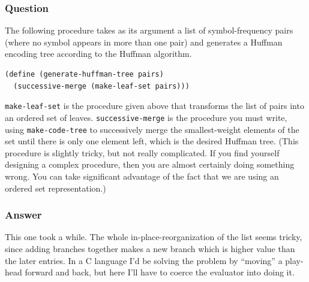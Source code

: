 \documentclass[final,fleqn,titlepage,twoside]{article}
\begin{document}
\subsubsection{Question}
\label{sec:org10b4c77}
The following procedure takes as its argument a list of symbol-frequency pairs
(where no symbol appears in more than one pair) and generates a Huffman encoding
tree according to the Huffman algorithm.

\begin{verbatim}
(define (generate-huffman-tree pairs)
  (successive-merge (make-leaf-set pairs)))
\end{verbatim}

\texttt{make-leaf-set} is the procedure given above that transforms the list
of pairs into an ordered set of leaves. \texttt{successive-merge} is the
procedure you must write, using \texttt{make-code-tree} to successively merge
the smallest-weight elements of the set until there is only one element left,
which is the desired Huffman tree. (This procedure is slightly tricky, but not
really complicated. If you find yourself designing a complex procedure, then you
are almost certainly doing something wrong. You can take significant advantage
of the fact that we are using an ordered set representation.)

\subsubsection{Answer}
\label{sec:org38165e8}
This one took a while. The whole in-place-reorganization of the list seems
tricky, since adding branches together makes a new branch which is higher value
than the later entries. In a C language I'd be solving the problem by ``moving'' a
play-head forward and back, but here I'll have to coerce the evaluator into
doing it.
\end{document}
